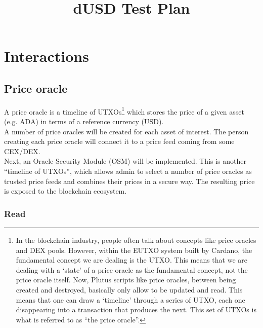 \documentclass{article} %
\title{dUSD Test Plan}
\begin{document}
\maketitle


\section{Interactions}

\subsection{Price oracle}


A price oracle is a timeline of UTXOs\footnote{
  In the blockchain industry, people often talk about concepts like price
  oracles and DEX pools. However, within the EUTXO system built by Cardano, the
  fundamental concept we are dealing is the UTXO. This means that we are dealing
  with a `state' of a price oracle as the fundamental concept, not the price
  oracle itself. Now, Plutus scripts like price oracles, between being created
  and destroyed, basically only allow to be updated and read. This means that
  one can draw a `timeline' through a series of UTXO, each one disappearing into
  a transaction that produces the next. This set of UTXOs is what is referred to
  as ``the price oracle''.
}
which stores the price of a given asset (e.g. ADA) in terms of a reference
currency (USD). \\

A number of price oracles will be created for each asset of interest.
The person creating each price oracle will connect it to a price feed coming
from some CEX/DEX. \\

Next, an Oracle Security Module (OSM) will be implemented.
This is another ``timeline of UTXOs'', which allows admin to select a number of
price oracles as trusted price feeds and combines their prices in a secure way.
The resulting price is exposed to the blockchain ecosystem.

\subsubsection{Read}
\end{document}
